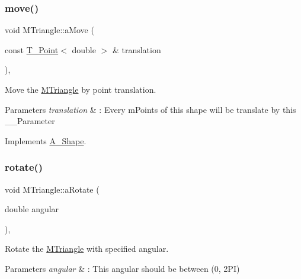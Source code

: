 \mbox{\label{classMTriangle_aa21f0514a8af2beba5ecf2ea5a22a4ef}} 
\subsubsection{\texorpdfstring{move()}{move()}}
{\footnotesize\ttfamily void M\+Triangle\+::aMove (\begin{DoxyParamCaption}\item[{const \hyperlink{classPoint}{T_Point}$<$ double $>$ \&}]{translation }\end{DoxyParamCaption})\hspace{0.3cm}{\ttfamily [override]}, {\ttfamily [virtual]}}



Move the \hyperlink{classMTriangle}{M\+Triangle} by point translation. 


\begin{DoxyParams}{Parameters}
{\em translation} & \+: Every mPoints of this shape will be translate by this __Parameter \\
\hline
\end{DoxyParams}


Implements \hyperlink{classShape_a1f447acd6219cb10b9b7a40371519c46}{A_Shape}.

\mbox{\label{classMTriangle_a4be29553eeddf99c367b1ec220bc102b}} 
\subsubsection{\texorpdfstring{rotate()}{Rotate()}}
{\footnotesize\ttfamily void M\+Triangle\+::aRotate (\begin{DoxyParamCaption}\item[{double}]{angular }\end{DoxyParamCaption})\hspace{0.3cm}{\ttfamily [override]}, {\ttfamily [virtual]}}



Rotate the \hyperlink{classMTriangle}{M\+Triangle} with specified angular.


\begin{DoxyParams}{Parameters}
{\em angular} & \+: This angular should be between (0, 2\+PI) \\
\hline
\end{DoxyParams}


